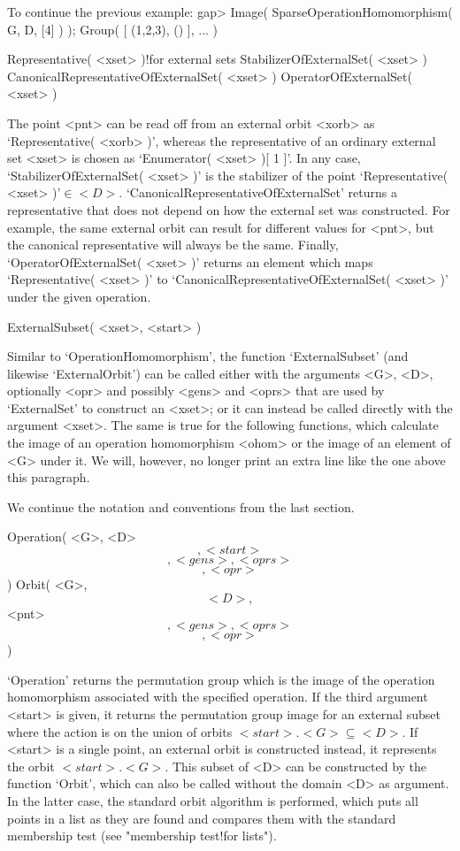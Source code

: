 To continue the previous example:
\begintt
    gap> Image( SparseOperationHomomorphism( G, D, [4] ) );
    Group( [ (1,2,3), () ], ... )
\endtt

\>Representative( <xset> )!{for external sets}
\>StabilizerOfExternalSet( <xset> )
\>CanonicalRepresentativeOfExternalSet( <xset> )
\>OperatorOfExternalSet( <xset> )

The    point <pnt> can be read    off from an   external  orbit <xorb> as
`Representative( <xorb>  )',  whereas the  representative of an  ordinary
external set <xset> is  chosen  as `Enumerator( <xset>   )[ 1 ]'. In  any
case, `StabilizerOfExternalSet( <xset> )' is the  stabilizer of the point
`Representative(         <xset>               )'${}\in              <D>$.
`CanonicalRepresentativeOfExternalSet' returns a representative that does
not depend on how the external set was constructed. For example, the same
external  orbit  can  result for  different  values   for <pnt>, but  the
canonical  representative     will    always   be   the  same.   Finally,
`OperatorOfExternalSet( <xset>   )'    returns an   element  which   maps
`Representative(  <xset> )' to     `CanonicalRepresentativeOfExternalSet(
<xset> )' under the given operation.

\)ExternalSubset( <xset>, <start> )

Similar  to  `OperationHomomorphism',  the function `ExternalSubset' (and
likewise `ExternalOrbit') can be called   either with the arguments  <G>,
<D>,  optionally <opr> and  possibly <gens> and <oprs>   that are used by
`ExternalSet' to  construct  an  <xset>; or   it  can instead  be  called
directly with  the argument <xset>.  The same is   true for the following
functions, which calculate the  image of an operation homomorphism <ohom>
or the image of an element  of <G> under it.  We will, however, no longer
print an extra line like the one above this paragraph.


We continue the notation and conventions from the last section.

\>Operation( <G>, <D> \[, <start> \] \[, <gens>, <oprs> \] \[, <opr> \] )
\>Orbit( <G>, \[ <D>, \] <pnt> \[, <gens>, <oprs> \] \[, <opr> \] )

`Operation'  returns   the permutation group  which  is  the image of the
operation homomorphism associated with   the specified operation.  If the
third  argument <start> is given, it  returns the permutation group image
for  an external  subset  where  the  action is  on  the  union of orbits
$<start>.<G> \subseteq <D>$. If <start>   is a single point, an  external
orbit is constructed instead, it represents the orbit $<start>.<G>$. This
subset of <D> can be constructed by the function  `Orbit', which can also
be called without the  domain <D>  as  argument. In the latter  case, the
standard orbit algorithm is performed, which puts all points in a list as
they are found and  compares them with  the standard membership test (see
"membership test!for lists").

